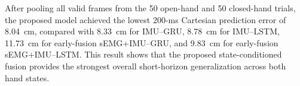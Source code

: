 After pooling all valid frames from the 50 open-hand and 50 closed-hand trials,
the proposed model achieved the lowest 200-ms Cartesian prediction error of
8.04~cm, compared with 8.33~cm for IMU--GRU, 8.78~cm for IMU--LSTM,
11.73~cm for early-fusion sEMG+IMU--GRU, and 9.83~cm for early-fusion
sEMG+IMU--LSTM. This result shows that the proposed state-conditioned fusion
provides the strongest overall short-horizon generalization across both hand
states.
